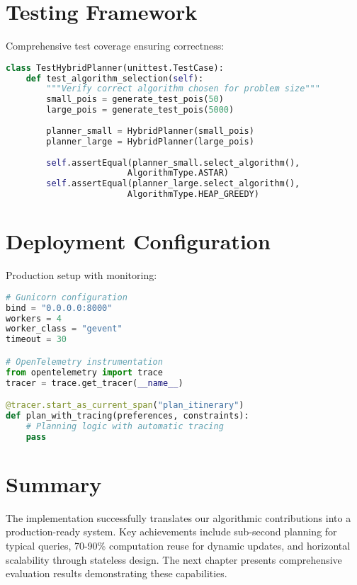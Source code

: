 \section{Testing Framework}

Comprehensive test coverage ensuring correctness:
\begin{lstlisting}[language=Python]
class TestHybridPlanner(unittest.TestCase):
    def test_algorithm_selection(self):
        """Verify correct algorithm chosen for problem size"""
        small_pois = generate_test_pois(50)
        large_pois = generate_test_pois(5000)
        
        planner_small = HybridPlanner(small_pois)
        planner_large = HybridPlanner(large_pois)
        
        self.assertEqual(planner_small.select_algorithm(), 
                        AlgorithmType.ASTAR)
        self.assertEqual(planner_large.select_algorithm(), 
                        AlgorithmType.HEAP_GREEDY)
\end{lstlisting}

\section{Deployment Configuration}

Production setup with monitoring:
\begin{lstlisting}[language=Python]
# Gunicorn configuration
bind = "0.0.0.0:8000"
workers = 4
worker_class = "gevent"
timeout = 30

# OpenTelemetry instrumentation
from opentelemetry import trace
tracer = trace.get_tracer(__name__)

@tracer.start_as_current_span("plan_itinerary")
def plan_with_tracing(preferences, constraints):
    # Planning logic with automatic tracing
    pass
\end{lstlisting}

\section{Summary}

The implementation successfully translates our algorithmic contributions into a production-ready system. Key achievements include sub-second planning for typical queries, 70-90\% computation reuse for dynamic updates, and horizontal scalability through stateless design. The next chapter presents comprehensive evaluation results demonstrating these capabilities.